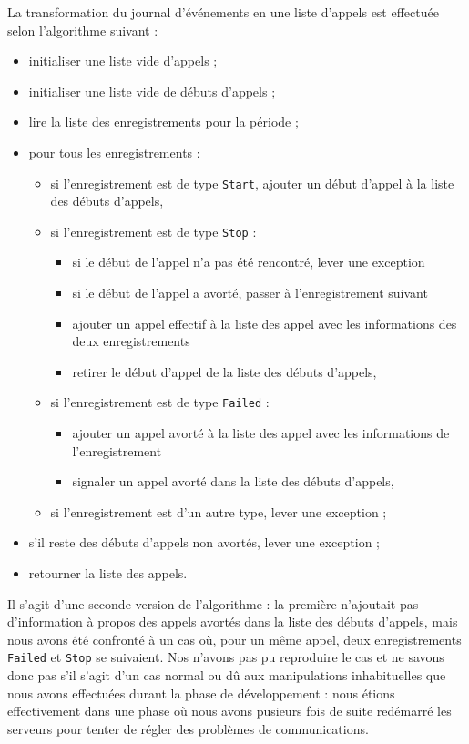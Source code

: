 La transformation du journal d’événements en une liste d’appels est effectuée selon l’algorithme suivant :
\begin{itemize}
	\item initialiser une liste vide d’appels ;
	\item initialiser une liste vide de débuts d’appels ;
	\item lire la liste des enregistrements pour la période ;
	\item pour tous les enregistrements :
		\begin{itemize}
			\item si l’enregistrement est de type \texttt{Start}, ajouter un début d’appel à la liste des débuts d’appels,
			\item si l’enregistrement est de type \texttt{Stop} :
				\begin{itemize}
					\item si le début de l’appel n’a pas été rencontré, lever une exception
					\item si le début de l’appel a avorté, passer à l’enregistrement suivant
					\item ajouter un appel effectif à la liste des appel avec les informations des deux enregistrements
					\item retirer le début d’appel de la liste des débuts d’appels,
				\end{itemize}
			\item si l’enregistrement est de type \texttt{Failed} :
				\begin{itemize}
					\item ajouter un appel avorté à la liste des appel avec les informations de l’enregistrement
					\item signaler un appel avorté dans la liste des débuts d’appels,
				\end{itemize}
			\item si l’enregistrement est d’un autre type, lever une exception ;
		\end{itemize}
	\item s’il reste des débuts d’appels non avortés, lever une exception ;
	\item retourner la liste des appels.
\end{itemize}

Il s’agit d’une seconde version de l’algorithme : la première n’ajoutait pas d’information à propos des appels avortés dans la liste des débuts d’appels, mais nous avons été confronté à un cas où, pour un même appel, deux enregistrements \texttt{Failed} et \texttt{Stop} se suivaient. Nos n’avons pas pu reproduire le cas et ne savons donc pas s’il s’agit d’un cas normal ou dû aux manipulations inhabituelles que nous avons effectuées durant la phase de développement : nous étions effectivement dans une phase où nous avons pusieurs fois de suite redémarré les serveurs pour tenter de régler des problèmes de communications.
